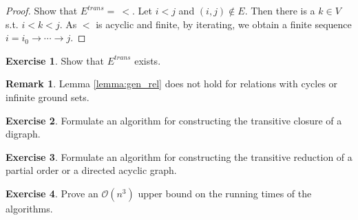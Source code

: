 \documentclass[11pt,a4paper,notitlepage]{article}
\providecommand{\Oh}{\mathcal{O}} %
\theoremstyle{plain}
\theoremstyle{definition}
\newtheorem{remark}[defn]{Remark}
\newtheorem{exercise}{Exercise}
\begin{document}
\begin{proof}
  Show that $E^{trans} =\ <$. Let $i<j$ and $(i,j)\not\in E$. Then there is a $k\in V$ s.t. $i<k<j$. As $<$ is acyclic and finite, by iterating, we obtain a finite sequence $i=i_{0}\rightarrow \cdots \rightarrow j$.
\end{proof}

\begin{exercise}
  Show that $E^{trans}$ exists.
\end{exercise}

\begin{remark}
  Lemma \ref{lemma:gen_rel} does not hold for relations with cycles or infinite ground sets.
\end{remark}

\begin{exercise}
  Formulate an algorithm for constructing the transitive closure of a digraph.
\end{exercise}

\begin{exercise}
  Formulate an algorithm for constructing the transitive reduction of a partial order or a directed acyclic graph.
\end{exercise}

\begin{exercise}
  Prove an $\Oh(n^{3})$ upper bound on the running times of the algorithms.
\end{exercise}


%

%
\end{document}
